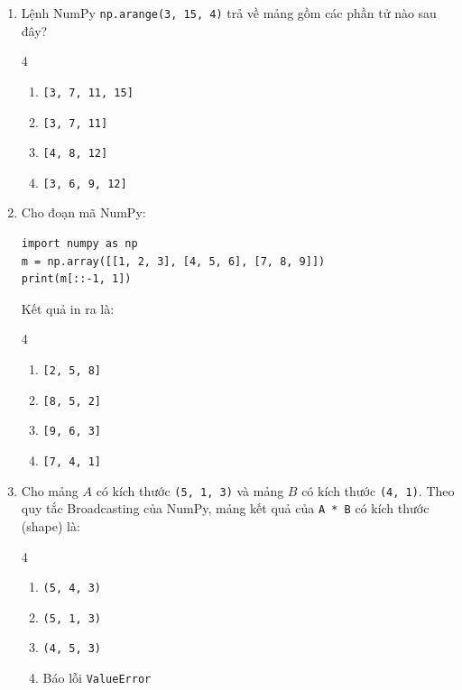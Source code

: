 \documentclass[11pt,a4paper]{article}
\begin{document}
\newpage
\begin{enumerate}[leftmargin=*,itemsep=2.5pt,resume]

\item Lệnh NumPy \texttt{np.arange(3, 15, 4)} trả về mảng gồm các phần tử nào sau đây?
\begin{multicols}{4}
\begin{enumerate}[label=\Alph*.]
  \item \texttt{[3, 7, 11, 15]}
  \item \texttt{[3, 7, 11]}
  \item \texttt{[4, 8, 12]}
  \item \texttt{[3, 6, 9, 12]}
\end{enumerate}
\end{multicols}

\item Cho đoạn mã NumPy:
\begin{lstlisting}
import numpy as np
m = np.array([[1, 2, 3], [4, 5, 6], [7, 8, 9]])
print(m[::-1, 1])
\end{lstlisting}
Kết quả in ra là:
\begin{multicols}{4}
\begin{enumerate}[label=\Alph*.]
  \item \texttt{[2, 5, 8]}
  \item \texttt{[8, 5, 2]}
  \item \texttt{[9, 6, 3]}
  \item \texttt{[7, 4, 1]}
\end{enumerate}
\end{multicols}

\item Cho mảng $A$ có kích thước \texttt{(5, 1, 3)} và mảng $B$ có kích thước \texttt{(4, 1)}. Theo quy tắc Broadcasting của NumPy, mảng kết quả của \texttt{A * B} có kích thước (shape) là:
\begin{multicols}{4}
\begin{enumerate}[label=\Alph*.]
  \item \texttt{(5, 4, 3)}
  \item \texttt{(5, 1, 3)}
  \item \texttt{(4, 5, 3)}
  \item Báo lỗi \texttt{ValueError}
\end{enumerate}
\end{multicols}


\end{enumerate}
\end{document}
